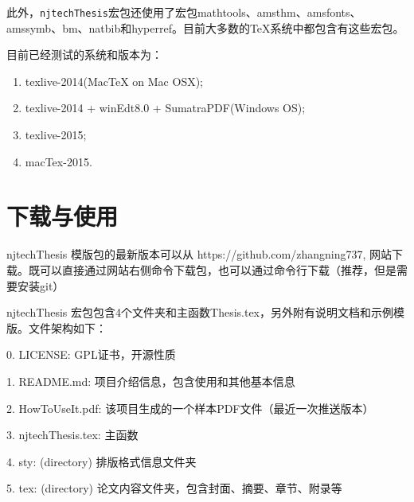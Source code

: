 此外，\texttt{njtechThesis}宏包还使用了宏包mathtools、amsthm、amsfonts、amssymb、bm、natbib和hyperref。目前大多数的\TeX{}系统中都包含有这些宏包。

目前已经测试的系统和版本为：
\begin{enumerate}
\item texlive-2014(MacTeX on Mac OSX);

\item texlive-2014 + winEdt8.0 + SumatraPDF(Windows OS);

\item texlive-2015;

\item macTex-2015.

\end{enumerate}

{}

\section{下载与使用}
\label{sec:howtouse}
njtechThesis 模版包的最新版本可以从 https://github.com/zhangning737, 网站下载。既可以直接通过网站右侧命令下载包，也可以通过命令行下载（推荐，但是需要安装git）

\begin{center}
  {\color{blue}{git clone https://github.com/zhangning737/njtechThesisMaster.git}}
\end{center}


njtechThesis 宏包包含4个文件夹和主函数Thesis.tex，另外附有说明文档和示例模版。文件架构如下：

0. LICENSE: GPL证书，开源性质

1. README.md: 项目介绍信息，包含使用和其他基本信息

2. HowToUseIt.pdf: 该项目生成的一个样本PDF文件（最近一次推送版本）

3. njtechThesis.tex: 主函数

4. sty: (directory) 排版格式信息文件夹

5. tex: (directory) 论文内容文件夹，包含封面、摘要、章节、附录等

